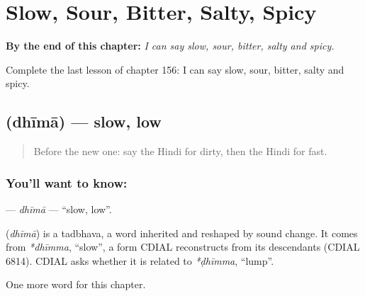 
\chapter{Slow, Sour, Bitter, Salty, Spicy}
\label{ch:hi-slow-sour-bitter-salty-spicy}

\begin{chapteropening}
\textbf{By the end of this chapter:} \emph{I can say slow, sour, bitter, salty and spicy.}

Complete the last lesson of chapter 156: I can say slow, sour, bitter, salty and spicy.
\end{chapteropening}

\section[\texorpdfstring{\hi{धीमा} (dhīmā)}{धीमा (dhīmā)}]{ (dhīmā) — slow, low}

\label{lesson:HI-C156-dhima}



\begin{quote}
Before the new one: say the Hindi for dirty, then the Hindi for fast.
\end{quote}

\subsection*{You'll want to know: }
\textbf{} — \emph{dhīmā} — \textquotedblleft{}slow, low\textquotedblright{}.

\begin{cousinweb}
\textbf{} (\emph{dhīmā}) is a tadbhava, a word inherited and reshaped by sound change. It comes from \emph{*dhīmma}, \textquotedblleft{}slow\textquotedblright{}, a form CDIAL reconstructs from its descendants (CDIAL 6814). CDIAL asks whether it is related to \emph{*ḍhīmma}, \textquotedblleft{}lump\textquotedblright{}.
\end{cousinweb}

\begin{grammarlens}[title={What you've built}]
One more word for this chapter.
\end{grammarlens}

